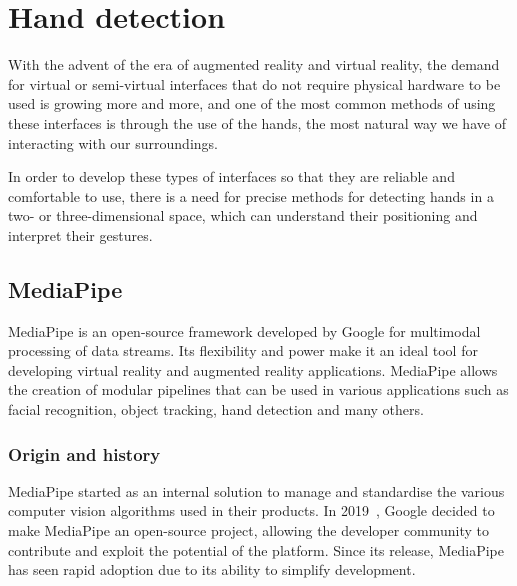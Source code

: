 \section{Hand detection}\label{sec:hand-detection}
With the advent of the era of augmented reality and virtual reality, the demand for virtual or semi-virtual interfaces
that do not require physical hardware to be used is growing more and more, and one of the most common methods of using
these interfaces is through the use of the hands, the most natural way we have of interacting with our surroundings.

In order to develop these types of interfaces so that they are reliable and comfortable to use,
there is a need for precise methods for detecting hands in a two- or three-dimensional space,
which can understand their positioning and interpret their gestures.

\subsection{MediaPipe}\label{subsec:mediapipe}
MediaPipe is an open-source framework developed by Google for multimodal processing of data streams.
Its flexibility and power make it an ideal tool for developing virtual reality and augmented reality applications.
MediaPipe allows the creation of modular pipelines that can be used in various applications such as facial recognition,
object tracking, hand detection and many others.

\subsubsection{Origin and history}
MediaPipe started as an internal solution to manage and standardise the various computer vision algorithms used in their products.
In 2019~\cite{mediapipe}, Google decided to make MediaPipe an open-source project,
allowing the developer community to contribute and exploit the potential of the platform.
Since its release, MediaPipe has seen rapid adoption due to its ability to simplify development.


